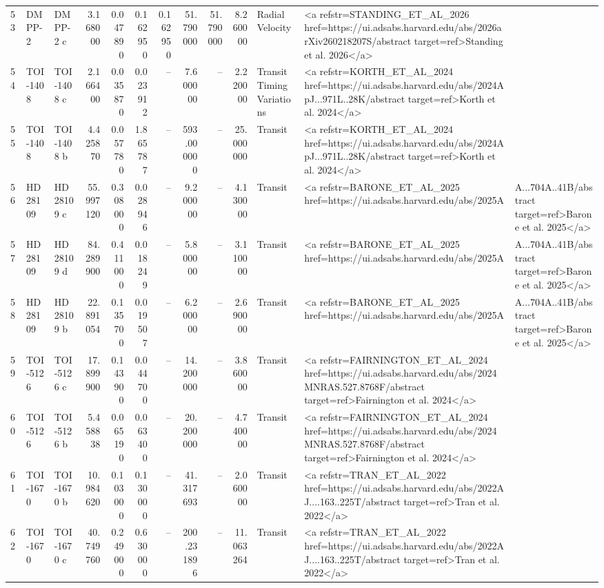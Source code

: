 \begin{tabular}{lllrrrrrrrll}
53 & DMPP-2 & DMPP-2 c & 3.168000 & 0.047890 & 0.162950 & 0.162950 & 51.790000 & 51.790000 & 8.260000 & Radial Velocity & <a refstr=STANDING_ET_AL_2026 href=https://ui.adsabs.harvard.edu/abs/2026arXiv260218207S/abstract target=ref>Standing et al. 2026</a> \\
54 & TOI-1408 & TOI-1408 c & 2.166400 & 0.035870 & 0.023912 & -- & 7.600000 & -- & 2.220000 & Transit Timing Variations & <a refstr=KORTH_ET_AL_2024 href=https://ui.adsabs.harvard.edu/abs/2024ApJ...971L..28K/abstract target=ref>Korth et al. 2024</a> \\
55 & TOI-1408 & TOI-1408 b & 4.425870 & 0.057780 & 1.865787 & -- & 593.000000 & -- & 25.000000 & Transit & <a refstr=KORTH_ET_AL_2024 href=https://ui.adsabs.harvard.edu/abs/2024ApJ...971L..28K/abstract target=ref>Korth et al. 2024</a> \\
56 & HD 28109 & HD 28109 c & 55.997120 & 0.308000 & 0.028946 & -- & 9.200000 & -- & 4.130000 & Transit & <a refstr=BARONE_ET_AL_2025 href=https://ui.adsabs.harvard.edu/abs/2025A&A...704A..41B/abstract target=ref>Barone et al. 2025</a> \\
57 & HD 28109 & HD 28109 d & 84.289900 & 0.411000 & 0.018249 & -- & 5.800000 & -- & 3.110000 & Transit & <a refstr=BARONE_ET_AL_2025 href=https://ui.adsabs.harvard.edu/abs/2025A&A...704A..41B/abstract target=ref>Barone et al. 2025</a> \\
58 & HD 28109 & HD 28109 b & 22.891054 & 0.135700 & 0.019507 & -- & 6.200000 & -- & 2.690000 & Transit & <a refstr=BARONE_ET_AL_2025 href=https://ui.adsabs.harvard.edu/abs/2025A&A...704A..41B/abstract target=ref>Barone et al. 2025</a> \\
59 & TOI-5126 & TOI-5126 c & 17.899900 & 0.143900 & 0.044700 & -- & 14.200000 & -- & 3.860000 & Transit & <a refstr=FAIRNINGTON_ET_AL_2024 href=https://ui.adsabs.harvard.edu/abs/2024MNRAS.527.8768F/abstract target=ref>Fairnington et al. 2024</a> \\
60 & TOI-5126 & TOI-5126 b & 5.458838 & 0.065190 & 0.063400 & -- & 20.200000 & -- & 4.740000 & Transit & <a refstr=FAIRNINGTON_ET_AL_2024 href=https://ui.adsabs.harvard.edu/abs/2024MNRAS.527.8768F/abstract target=ref>Fairnington et al. 2024</a> \\
61 & TOI-1670 & TOI-1670 b & 10.984620 & 0.103000 & 0.130000 & -- & 41.317693 & -- & 2.060000 & Transit & <a refstr=TRAN_ET_AL_2022 href=https://ui.adsabs.harvard.edu/abs/2022AJ....163..225T/abstract target=ref>Tran et al. 2022</a> \\
62 & TOI-1670 & TOI-1670 c & 40.749760 & 0.249000 & 0.630000 & -- & 200.231896 & -- & 11.063264 & Transit & <a refstr=TRAN_ET_AL_2022 href=https://ui.adsabs.harvard.edu/abs/2022AJ....163..225T/abstract target=ref>Tran et al. 2022</a> \\

\end{tabular}
